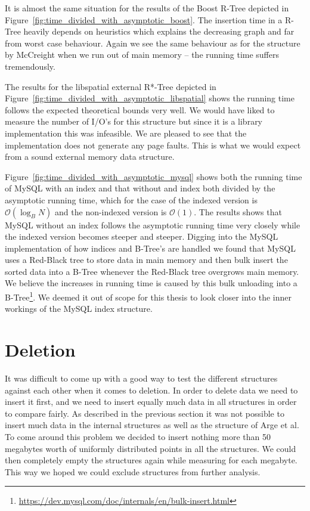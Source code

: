 \documentclass[twoside,11pt,openright]{report}
\begin{document}
It is almost the same situation for the results of the Boost R-Tree depicted in Figure~\ref{fig:time_divided_with_asymptotic_boost}. The insertion time in a R-Tree heavily depends on heuristics which explains the decreasing graph and far from worst case behaviour. Again we see the same behaviour as for the structure by McCreight when we run out of main memory -- the running time suffers tremendously.

The results for the libspatial external R*-Tree depicted in Figure~\ref{fig:time_divided_with_asymptotic_libspatial} shows the running time follows the expected theoretical bounds very well. We would have liked to measure the number of I/O's for this structure but since it is a library implementation this was infeasible. We are pleased to see that the implementation does not generate any page faults. This is what we would expect from a sound external memory data structure.

Figure~\ref{fig:time_divided_with_asymptotic_mysql} shows both the running time of MySQL with an index and that without and index both divided by the asymptotic running time, which for the case of the indexed version is $\mathcal{O}(\log_B N)$ and the non-indexed version is $\mathcal{O}(1)$. The results shows that MySQL without an index follows the asymptotic running time very closely while the indexed version becomes steeper and steeper. Digging into the MySQL implementation of how indices and B-Tree's are handled we found that MySQL uses a Red-Black tree to store data in main memory and then bulk insert the sorted data into a B-Tree whenever the Red-Black tree overgrows main memory. We believe the increases in running time is caused by this bulk unloading into a B-Tree\footnote{\url{https://dev.mysql.com/doc/internals/en/bulk-insert.html}}. We deemed it out of scope for this thesis to look closer into the inner workings of the MySQL index structure.

\clearpage

\section{Deletion}
It was difficult to come up with a good way to test the different structures against each other when it comes to deletion. In order to delete data we need to insert it first, and we need to insert equally much data in all structures in order to compare fairly. As described in the previous section it was not possible to insert much data in the internal structures as well as the structure of Arge et al. To come around this problem we decided to insert nothing more than 50 megabytes worth of uniformly distributed points in all the structures. We could then completely empty the structures again while measuring for each megabyte. This way we hoped we could exclude structures from further analysis.
\end{document}
